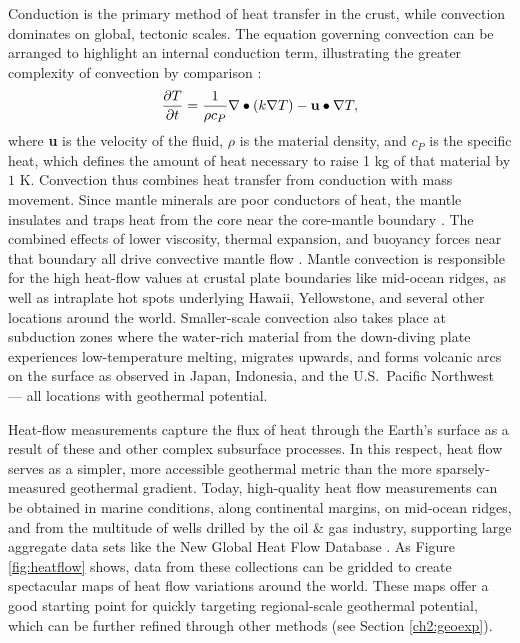 Conduction is the primary method of heat transfer in the crust, while convection dominates on global, tectonic scales. The equation governing convection can be arranged to highlight an internal conduction term, illustrating the greater complexity of convection by comparison \citep[p.\ 267]{turcotte_geodynamics_2002}:
\begin{equation}\label{eq:convection}
\frac{\partial T}{\partial t} = \frac{1}{\rho c_P}\nabla\bullet\left(k\nabla T\right)-{\bf u}\bullet\nabla T,
\end{equation}
where \textbf{u} is the velocity of the fluid, $\rho$ is the material density, and $c_P$ is the specific heat, which defines the amount of heat necessary to raise 1 kg of that material by $1$ K. Convection thus combines heat transfer from conduction with mass movement. Since mantle minerals are poor conductors of heat, the mantle insulates and traps heat from the core near the core-mantle boundary \citep[p.\ 25]{glassley_geothermal_2015}. The combined effects of lower viscosity, thermal expansion, and buoyancy forces near that boundary all drive convective mantle flow \citep[p.\ 25]{glassley_geothermal_2015}. Mantle convection is responsible for the high heat-flow values at crustal plate boundaries like mid-ocean ridges, as well as intraplate hot spots underlying Hawaii, Yellowstone, and several other locations around the world. Smaller-scale convection also takes place at subduction zones where the water-rich material from the down-diving plate experiences low-temperature melting, migrates upwards, and forms volcanic arcs on the surface as observed in Japan, Indonesia, and the U.S.\ Pacific Northwest \citep[p.\ 31--33]{press_understanding_2004} --– all locations with geothermal potential.

Heat-flow measurements capture the flux of heat through the Earth’s surface as a result of these and other complex subsurface processes. In this respect, heat flow serves as a simpler, more accessible geothermal metric than the more sparsely-measured geothermal gradient. Today, high-quality heat flow measurements can be obtained in marine conditions, along continental margins, on mid-ocean ridges, and from the multitude of wells drilled by the oil \& gas industry, supporting large aggregate data sets like the New Global Heat Flow Database \citep{lucazeau_analysis_2019}. As Figure \ref{fig:heatflow} shows, data from these collections can be gridded to create spectacular maps of heat flow variations around the world. These maps offer a good starting point for quickly targeting regional-scale geothermal potential, which can be further refined through other methods (see Section \ref{ch2:geoexp}).

